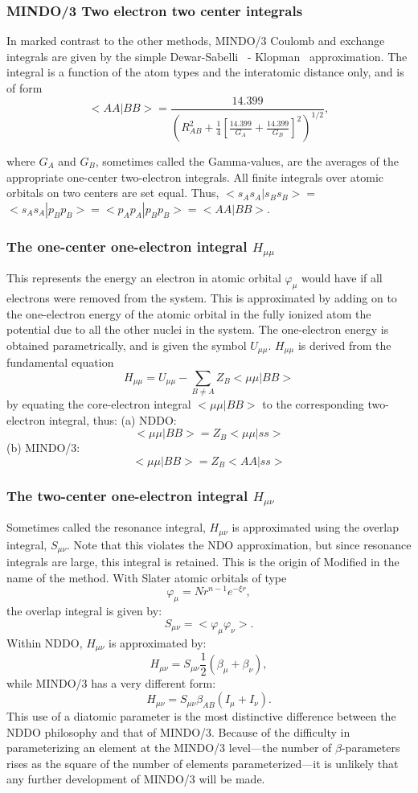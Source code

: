 \subsubsection{MINDO/3 Two electron two center integrals}
 In marked contrast to the other methods, MINDO/3 Coulomb
and exchange integrals are given by the simple Dewar-Sabelli~\cite{rab,rab2} -
Klopman~\cite{rab3} approximation. The integral is a
function of the atom types and the interatomic distance
only, and is of form
$$
<AA|BB>=\frac{14.399}{(R_{AB}^2+\frac{1}{4}[\frac{14.399}{G_A}+
\frac{14.399}{G_B}]^2)^{1/2}},
$$

where $G_A$ and $G_B$, sometimes called the Gamma-values,
are the averages of the appropriate
one-center two-electron integrals. All finite integrals
over atomic orbitals on two centers are set equal. Thus,
$<s_As_A|s_Bs_B> =$  $<s_As_A|p_Bp_B> =<p_Ap_A|p_Bp_B> =<AA|BB> $.
\subsubsection{The one-center one-electron integral $H_{\mu\mu}$}\label{1e1c}
 This represents the energy an electron in atomic orbital
$\varphi_{\mu}$ would have if all electrons were removed from the system.
This is approximated by adding on to the one-electron energy
of the atomic orbital in the fully ionized atom the
potential due to all the other nuclei in the system. The
one-electron energy is obtained parametrically, and is given
the symbol $U_{\mu\mu}$. $H_{\mu\mu}$ is derived from the fundamental
equation
$$
H_{\mu\mu}=U_{\mu\mu}-\sum_{B\neq A}Z_B<\mu\mu|BB>
$$
by equating the core-electron integral $<\mu\mu|BB>$ to the
corresponding two-electron integral, thus:
(a) NDDO:
$$
<\mu\mu|BB>= Z_B<\mu\mu|ss>
$$
(b) MINDO/3:
$$
<\mu\mu|BB>= Z_B<AA|ss>
$$
\subsubsection{The two-center one-electron integral $H_{\mu\nu}$ }

 Sometimes called the resonance integral, $H_{\mu\nu}$ is
approximated using the overlap integral, $S_{\mu\nu}$. Note that
this violates the NDO approximation, but since resonance
integrals are large, this integral is retained. This is the
origin of Modified in the name of the method.
With Slater atomic orbitals of type
$$
\varphi_\mu = Nr^{n-1}e^{-\xi r},
$$
the overlap integral is given by:
$$
S_{\mu\nu} = <\varphi_{\mu}\varphi_{\nu}>.
$$
Within NDDO, $H_{\mu\nu}$ is approximated by:
$$
H_{\mu\nu} = S_{\mu\nu}\frac{1}{2}(\beta_{\mu}+\beta_{\nu}),
$$
while MINDO/3 has a very different form:
$$
H_{\mu\nu} = S_{\mu\nu}\beta_{AB}(I_{\mu}+I_{\nu}).
$$
 This use of a diatomic parameter is the most distinctive
difference between the NDDO philosophy and that of
MINDO/3. Because of the difficulty in parameterizing an
element at the MINDO/3 level---the number of $\beta$-parameters
rises as the square of the number of elements
parameterized---it is unlikely that any further development
of MINDO/3 will be made.
